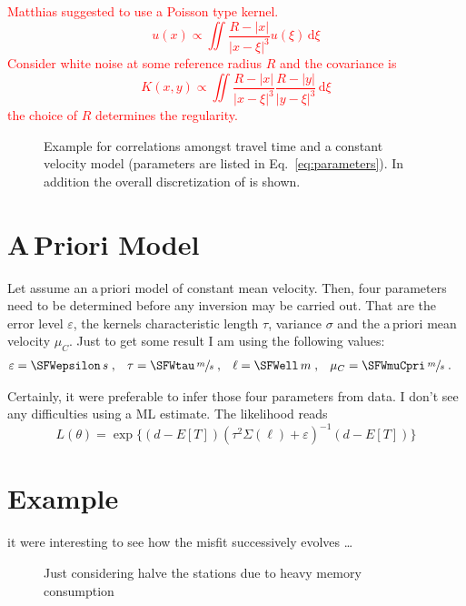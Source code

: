 \documentclass[11pt]{article}
\newcommand\worries[1]{\textcolor{red}{#1}}
\begin{document}
\worries{Matthias suggested to use a Poisson type kernel.
\begin{equation}
    u(x) \propto \iint \frac{R-|x|}{|x-\xi|^3} u(\xi) \, \mathrm d \xi
\end{equation}
Consider white noise at some reference radius $R$ and the covariance is
\begin{equation}
    K(x,y) \propto \iint \frac{R-|x|}{|x-\xi|^3} \frac{R-|y|}{|y-\xi|^3} \, \mathrm d \xi
\end{equation}
the choice of $R$ determines the regularity. }


\begin{figure}
    \centering
    
    \caption{Example for correlations amongst travel time and a constant velocity model (parameters are listed in Eq.~\ref{eq:parameters}).
        In addition the overall discretization of is shown. }
    \label{fig:correlation}
\end{figure}


\section{A\,Priori Model}

Let assume an a\,priori model of constant mean velocity.
Then, four parameters need to be determined before any inversion may be carried out.
That are the error level $\varepsilon$, the kernels characteristic length $\tau$, variance $\sigma$ and the a\,priori mean velocity $\mu_C$.
Just to get some result I am using the following values:
\begin{align}\label{eq:parameters}
    \varepsilon &= \SFWepsilon \, s \;,&
    \tau &= \SFWtau \, \sfrac ms \;,&
    \ell &= \SFWell \, m \;,&
    \mu_C &= \SFWmuCpri \, \sfrac ms \;.
\end{align}

Certainly, it were preferable to infer those four parameters from data.
I don't see any difficulties using a ML estimate.
The likelihood reads
\begin{equation}
    L(\theta) = \exp\{(d - E[T]) \left(\tau^2 \Sigma(\ell) + \varepsilon \right)^{-1} (d- E[T]) \}
\end{equation}


\section{Example}

it were interesting to see how the misfit successively evolves \dots
\begin{figure}
    \centering
    
    \caption{Just considering halve the stations due to heavy memory consumption }
    \label{fig:example}
\end{figure}
\end{document}
